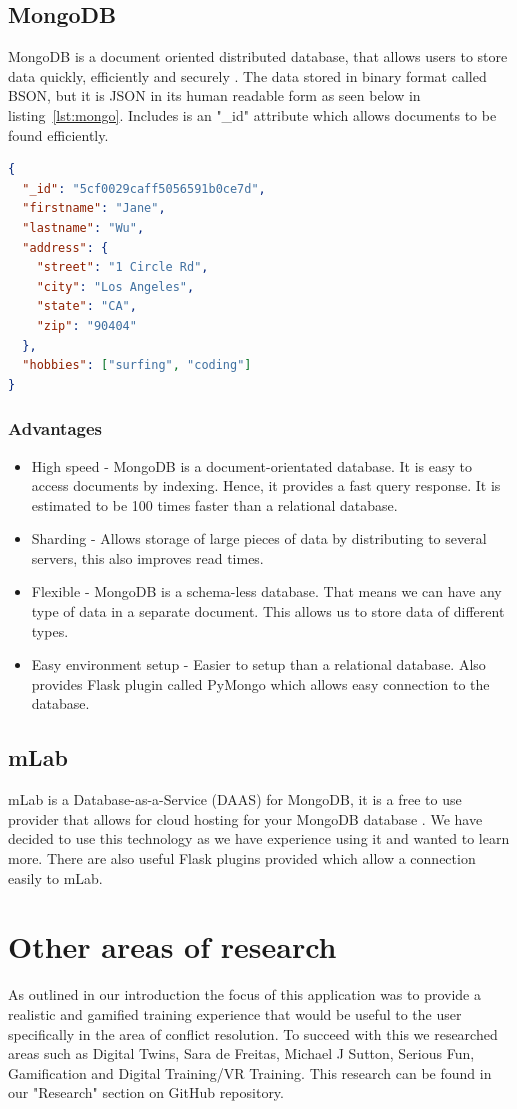 \subsection{MongoDB}
MongoDB is a document oriented distributed database, that allows users to store data quickly, efficiently and securely \cite{mongodb}. The data stored in binary format called BSON, but it is JSON in its human readable form as seen below in listing~\ref{lst:mongo}. Includes is an "\_id" attribute which allows documents to be found efficiently.

\begin{lstlisting}[caption={MongoDB document example.},label={lst:mongo}, language=JSON]
{
  "_id": "5cf0029caff5056591b0ce7d",
  "firstname": "Jane",
  "lastname": "Wu",
  "address": {
    "street": "1 Circle Rd",
    "city": "Los Angeles",
    "state": "CA",
    "zip": "90404"
  },
  "hobbies": ["surfing", "coding"]
}
\end{lstlisting}

\subsubsection{Advantages}
\begin{itemize}
    \item High speed - MongoDB is a document-orientated database. It is easy to access documents by indexing. Hence, it provides a fast query response. It is estimated to be 100 times faster than a relational database.
    \item Sharding - Allows storage of large pieces of data by distributing to several servers, this also improves read times.
    \item Flexible - MongoDB is a schema-less database. That means we can have any type of data in a separate document. This allows us to store data of different types.
    \item Easy environment setup - Easier to setup than a relational database. Also provides Flask plugin called PyMongo which allows easy connection to the database.
\end{itemize}

\subsection{mLab}
mLab is a Database-as-a-Service (DAAS) for MongoDB, it is a free to use provider that allows for cloud hosting for your MongoDB database \cite{mlab}. We have decided to use this technology as we have experience using it and wanted to learn more. There are also useful Flask plugins provided which allow a connection easily to mLab.

\section{Other areas of research}
As outlined in our introduction the focus of this application was to provide a realistic and gamified training experience that would be useful to the user specifically in the area of conflict resolution. To succeed with this we researched areas such as Digital Twins, Sara de Freitas, Michael J Sutton, Serious Fun, Gamification and Digital Training/VR Training. This research can be found in our "Research" section on GitHub repository.
